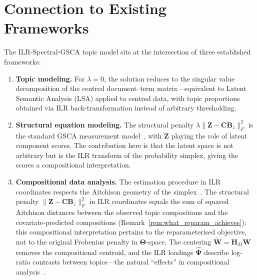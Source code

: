 \section{Connection to Existing Frameworks}
\label{sec:connections}

The ILR-Spectral-GSCA topic model sits at the intersection of three established
frameworks:
%
\begin{enumerate}
  \item \textbf{Topic modeling.}
    For $\lambda=0$, the solution reduces to the singular value
    decomposition of the centred document--term matrix---equivalent
    to Latent Semantic Analysis (LSA) applied to centred data, with
    topic proportions obtained via ILR back-transformation instead of
    arbitrary thresholding.

  \item \textbf{Structural equation modeling.}
    The structural penalty
    $\lambda\|\mathbf{Z}-\mathbf{C}\mathbf{B}_z\|_F^2$ is the standard
    GSCA measurement model~\citep{hwang2004generalized}, with
    $\mathbf{Z}$ playing the role of latent component scores.
    The contribution here is that the latent space is not arbitrary but
    is the ILR transform of the probability simplex, giving the scores
    a compositional interpretation.

  \item \textbf{Compositional data analysis.}
    The estimation procedure in ILR coordinates respects the Aitchison
    geometry of the simplex~\citep{aitchison1986statistical}. The
    structural penalty
    $\|\mathbf{Z}-\mathbf{C}\mathbf{B}_z\|_F^2$ in ILR coordinates
    equals the sum of squared Aitchison distances between the observed
    topic compositions and the covariate-predicted compositions
    (Remark~\ref{rem:what_reparam_achieves}); this compositional
    interpretation pertains to the reparameterised objective, not to
    the original Frobenius penalty in $\boldsymbol{\Theta}$-space.
    The centering $\widetilde{\mathbf{W}} = \mathbf{H}_M\mathbf{W}$
    removes the compositional centroid, and the ILR loadings
    $\hat{\boldsymbol{\Psi}}$ describe log-ratio contrasts between
    topics---the natural ``effects'' in compositional
    analysis~\citep{egozcue2003isometric,
    pawlowskyglahn2015modeling}.
\end{enumerate}